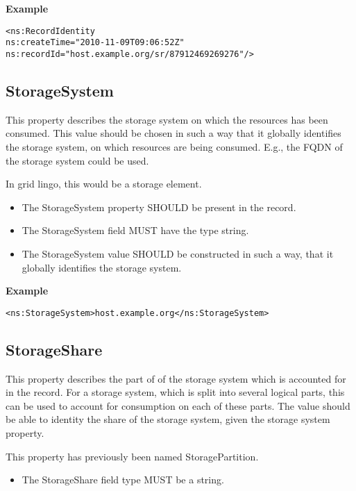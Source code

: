 {\bf Example}
\begin{verbatim}
<ns:RecordIdentity
ns:createTime="2010-11-09T09:06:52Z"
ns:recordId="host.example.org/sr/87912469269276"/>
\end{verbatim}


\subsection{StorageSystem}

This property describes the storage system on which the resources has been
consumed. This value should be chosen in such a way that it globally identifies
the storage system, on which resources are being consumed. E.g., the FQDN of
the storage system could be used.

In grid lingo, this would be a storage element.

\begin{itemize}
\item The StorageSystem property SHOULD be present in the record.
\item The StorageSystem field MUST have the type string.
\item The StorageSystem value SHOULD be constructed in such a way, that it
    globally identifies the storage system.
\end{itemize}

{\bf Example}
\begin{verbatim}
<ns:StorageSystem>host.example.org</ns:StorageSystem>
\end{verbatim}


\subsection{StorageShare}

This property describes the part of of the storage system which is accounted
for in the record. For a storage system, which is split into several logical
parts, this can be used to account for consumption on each of these parts.
The value should be able to identity the share of the storage system, given
the storage system property.

This property has previously been named StoragePartition.

\begin{itemize}
\item The StorageShare field type MUST be a string.
\end{itemize}

